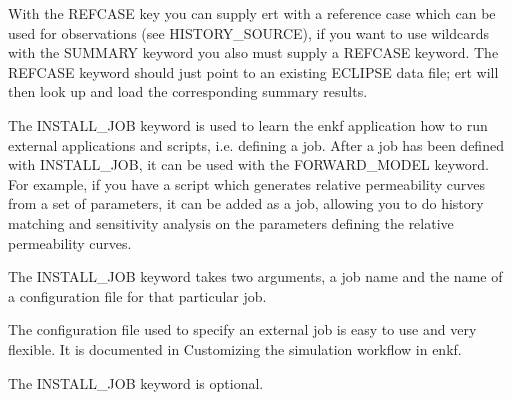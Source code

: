 \documentclass[letterpaper,10pt,english]{sphinxmanual}
\begin{document}
\label{\detokenize{keywords/index:refcase}}
\begin{sphinxShadowBox}

With the REFCASE key you can supply ert with a reference case which can be
used for observations (see HISTORY\_SOURCE), if you want to use wildcards with
the SUMMARY keyword you also must supply a REFCASE keyword. The REFCASE
keyword should just point to an existing ECLIPSE data file; ert will then look
up and load the corresponding summary results.


%
\begin{sphinxVerbatim}[commandchars=\\\{\}]
            
 
\end{sphinxVerbatim}
\end{sphinxShadowBox}
\label{\detokenize{keywords/index:install-job}}
\begin{sphinxShadowBox}

The INSTALL\_JOB keyword is used to learn the enkf application how to run
external applications and scripts, i.e. defining a job. After a job has been
defined with INSTALL\_JOB, it can be used with the FORWARD\_MODEL keyword. For
example, if you have a script which generates relative permeability curves
from a set of parameters, it can be added as a job, allowing you to do history
matching and sensitivity analysis on the parameters defining the relative
permeability curves.

The INSTALL\_JOB keyword takes two arguments, a job name and the name of a
configuration file for that particular job.


%
\begin{sphinxVerbatim}[commandchars=\\\{\}]
      
      
    
  
\end{sphinxVerbatim}

The configuration file used to specify an external job is easy to use and very
flexible. It is documented in Customizing the simulation workflow in enkf.

The INSTALL\_JOB keyword is optional.
\end{sphinxShadowBox}
\end{document}
